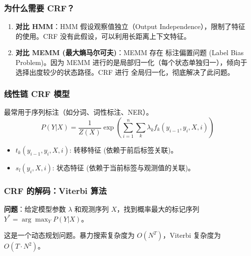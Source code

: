 \documentclass[a4paper, 11pt]{ctexart}
\begin{document}
\subsubsection{为什么需要 CRF？}
\begin{enumerate}
    \item \textbf{对比 HMM}：HMM 假设观察值独立（Output Independence），限制了特征的使用。CRF 没有此假设，可以利用长距离上下文特征。
    \item \textbf{对比 MEMM (最大熵马尔可夫)}：MEMM 存在 标注偏置问题 (Label Bias Problem)。因为 MEMM 进行的是局部归一化（每个状态单独归一），倾向于选择出度较少的状态路径。CRF 进行 全局归一化，彻底解决了此问题。
\end{enumerate}

\subsubsection{线性链 CRF 模型}
最常用于序列标注（如分词、词性标注、NER）。
\begin{equation}
    P(Y|X) = \frac{1}{Z(X)} \exp \left( \sum_{i=1}^n \sum_{k} \lambda_k f_k(y_{i-1}, y_i, X, i) \right)
\end{equation}
\begin{itemize}
    \item $t_k(y_{i-1}, y_i, X, i)$: 转移特征 (依赖于前后标签关联)。
    \item $s_l(y_i, X, i)$: 状态特征 (依赖于当前标签与观测值的关联)。
\end{itemize}

\subsubsection{CRF 的解码：Viterbi 算法}
\textbf{问题}：给定模型参数 $\lambda$ 和观测序列 $X$，找到概率最大的标记序列 $Y^* = \arg\max_Y P(Y|X)$。

这是一个动态规划问题。暴力搜索复杂度为 $O(N^T)$，Viterbi 复杂度为 $O(T \cdot N^2)$。
\end{document}
